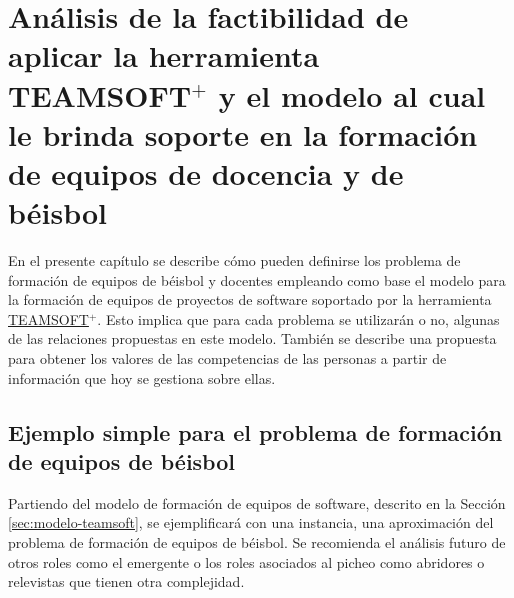 \chapter[Factibilidad de aplicar TEAMSOFT$^+$ en equipos docentes y de béisbol]{Análisis de la factibilidad de aplicar la herramienta TEAMSOFT$^+$ y el modelo al cual le brinda soporte en la formación de equipos de docencia y de béisbol}\label{chap:2}

En el presente capítulo se describe cómo pueden definirse los problema de formación de equipos de béisbol y docentes empleando como base el modelo para la formación de equipos de proyectos de software soportado por la herramienta \hyperref[sec:modelo-teamsoft]{TEAMSOFT$^+.$} Esto implica que para cada problema se utilizarán o no, algunas de las relaciones propuestas en este modelo. También se describe una propuesta para obtener los valores de las competencias de las personas a partir de información que hoy se gestiona sobre ellas.

\section{Ejemplo simple para el problema de formación de equipos de béisbol}\label{ejemplo-pel}

Partiendo del modelo de formación de equipos de software, descrito en la Sección \ref{sec:modelo-teamsoft}, se ejemplificará con una instancia, una aproximación del problema de formación de equipos de béisbol. Se recomienda el análisis futuro de otros roles como el emergente o los roles asociados al picheo como abridores o relevistas que tienen otra complejidad.

